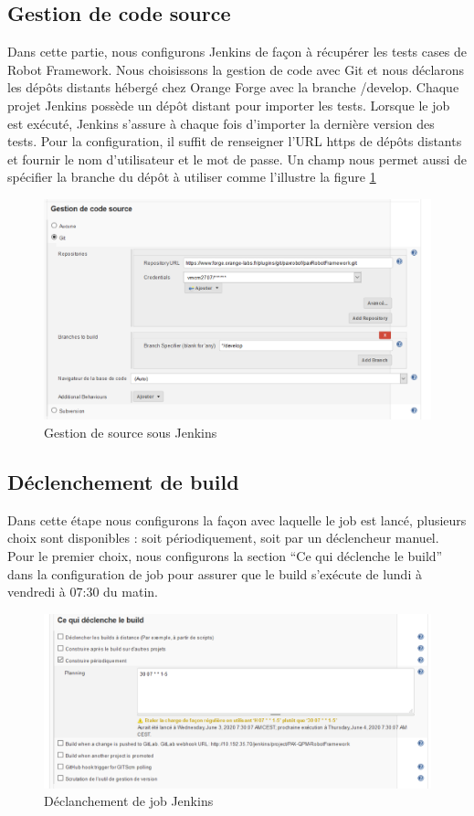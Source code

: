 \subsection{Gestion de code source}
Dans cette partie, nous configurons Jenkins de façon à récupérer les tests cases de Robot Framework. Nous choisissons la gestion de code avec Git et nous déclarons les dépôts distants hébergé chez Orange Forge avec la branche /develop. Chaque projet Jenkins possède un dépôt distant pour importer les tests. Lorsque le job est exécuté, Jenkins s’assure à chaque fois d’importer la dernière version des tests. Pour la configuration, il suffit de renseigner l’URL https de dépôts distants et fournir le nom d’utilisateur et le mot de passe. Un champ nous permet aussi de spécifier la branche du dépôt à utiliser comme l'illustre la figure \ref{fig:source-jenkins}
\begin{figure}[H]
	\centering
	\includegraphics[width=0.7\linewidth]{img/jenkins/source}
	\caption[Gestion de source sous Jenkins]{Gestion de source sous Jenkins}
	\label{fig:source-jenkins}
\end{figure}

\subsection{Déclenchement de build }
Dans cette étape nous configurons la façon avec laquelle le job est lancé, plusieurs choix sont disponibles : soit périodiquement, soit par un déclencheur manuel.\\
Pour le premier choix, nous configurons la section “Ce qui déclenche le build” dans la configuration de job pour assurer que le build s'exécute de lundi à vendredi à 07:30 du matin.
\begin{figure}[H]
	\centering
	\includegraphics[width=0.8\linewidth]{img/jenkins/declanchement}
	\caption[Déclanchement de job Jenkins]{Déclanchement de job Jenkins}
	\label{fig:declanchement}
\end{figure}

